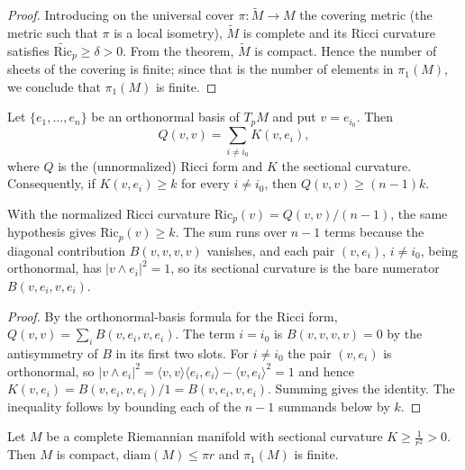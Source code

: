 \begin{proof}
  \leanok
  \sketch
  Introducing on the universal cover $\pi:\tilde M\to M$ the covering metric
  (the metric such that $\pi$ is a local isometry), $\tilde M$ is complete and its
  Ricci curvature satisfies $\widetilde{\mathrm{Ric}}_p\ge\delta>0$. From the theorem,
  $\tilde M$ is compact. Hence the number of sheets of the covering is finite; since
  that is the number of elements in $\pi_1(M)$, we conclude that $\pi_1(M)$ is
  finite.
\end{proof}
\begin{lemma}
  \label{lem:dc-ch9-3-3-ricci-sectional}
  \leanok
  Let $\{e_1,\dots,e_n\}$ be an orthonormal basis of $T_pM$ and put $v=e_{i_0}$. Then
  $$
  Q(v,v)=\sum_{i\ne i_0}K(v,e_i),
  $$
  where $Q$ is the (unnormalized) Ricci form and $K$ the sectional curvature.
  Consequently, if $K(v,e_i)\ge k$ for every $i\ne i_0$, then $Q(v,v)\ge(n-1)k$.

  With the normalized Ricci curvature
  $\mathrm{Ric}_p(v)=Q(v,v)/(n-1)$, the same hypothesis gives
  $\mathrm{Ric}_p(v)\ge k$. The sum runs over $n-1$ terms because the diagonal contribution $B(v,v,v,v)$
  vanishes, and each pair $(v,e_i)$, $i\ne i_0$, being orthonormal, has $|v\wedge e_i|^2=1$,
  so its sectional curvature is the bare numerator $B(v,e_i,v,e_i)$.
\end{lemma}
\begin{proof}
  \leanok
  \sketch
  By the orthonormal-basis formula for the Ricci form, $Q(v,v)=\sum_i B(v,e_i,v,e_i)$. The
  term $i=i_0$ is $B(v,v,v,v)=0$ by the antisymmetry of $B$ in its first two slots. For
  $i\ne i_0$ the pair $(v,e_i)$ is orthonormal, so
  $|v\wedge e_i|^2=\langle v,v\rangle\langle e_i,e_i\rangle-\langle v,e_i\rangle^2=1$ and
  hence $K(v,e_i)=B(v,e_i,v,e_i)/1=B(v,e_i,v,e_i)$. Summing gives the identity. The
  inequality follows by bounding each of the $n-1$ summands below by $k$.
\end{proof}
\begin{corollary}
  \label{cor:dc-ch9-3-3}
  Let $M$ be a complete Riemannian manifold with sectional curvature
  $K\ge\frac{1}{r^2}>0$. Then $M$ is compact, $\mathrm{diam}(M)\le\pi r$ and
  $\pi_1(M)$ is finite.
\end{corollary}
